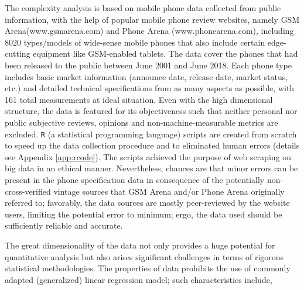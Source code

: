 \documentclass[utf8,english]{gradu3}
\begin{document}
The complexity analysis is based on mobile phone data collected from public information, with the help of popular mobile phone review websites, namely GSM Arena(www.gsmarena.com) and Phone Arena (www.phonearena.com), including 8020 types/models of wide-sense mobile phones that also include certain edge-cutting equipment like GSM-enabled tablets. The data cover the phones that had been released to the public between June 2001 and June 2018. Each phone type includes basic market information (announce date, release date, market status, etc.) and detailed technical specifications from as many aspects as possible, with 161 total measurements at ideal situation. Even with the high dimensional structure, the data is featured for its objectiveness such that neither personal nor public subjective reviews, opinions and non-machine-measurable metrics are excluded. \texttt{R} (a statistical programming language) scripts are created from scratch to speed up the data collection procedure and to eliminated human errors (details see Appendix \ref{app:rcode}). The scripts achieved the purpose of web scraping on big data in an ethical manner. Nevertheless, chances are that minor errors can be present in the phone specification data in consequence of the potentially non-cross-verified vintage sources that GSM Arena and/or Phone Arena originally referred to; favorably, the data sources are mostly peer-reviewed by the website users, limiting the potential error to minimum; ergo, the data used should be sufficiently reliable and accurate.

The great dimensionality of the data not only provides a huge potential for quantitative analysis but also arises significant challenges in terms of rigorous statistical methodologies. The properties of data prohibits the use of commonly adapted (generalized) linear regression model; such characteristics include,
\end{document}
